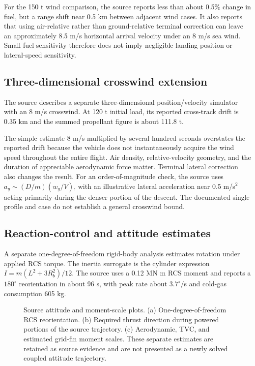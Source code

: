 \documentclass[11pt,a4paper]{article}
\begin{document}


For the 150 t wind comparison, the source reports less than about 0.5\% change in fuel, but a range shift near 0.5 km between adjacent wind cases. It also reports that using air-relative rather than ground-relative terminal correction can leave an approximately 8.5 m/s horizontal arrival velocity under an 8 m/s sea wind. Small fuel sensitivity therefore does not imply negligible landing-position or lateral-speed sensitivity.

\subsection{Three-dimensional crosswind extension}
The source describes a separate three-dimensional position/velocity simulator with an 8 m/s crosswind. At 120 t initial load, its reported cross-track drift is 0.35 km and the summed propellant figure is about 111.8 t.



The simple estimate $8$ m/s multiplied by several hundred seconds overstates the reported drift because the vehicle does not instantaneously acquire the wind speed throughout the entire flight. Air density, relative-velocity geometry, and the duration of appreciable aerodynamic force matter. Terminal lateral correction also changes the result. For an order-of-magnitude check, the source uses $a_y\sim(D/m)(w_y/V)$, with an illustrative lateral acceleration near 0.5 m/s$^2$ acting primarily during the denser portion of the descent. The documented single profile and case do not establish a general crosswind bound.

\subsection{Reaction-control and attitude estimates}
A separate one-degree-of-freedom rigid-body analysis estimates rotation under applied RCS torque. The inertia surrogate is the cylinder expression $I=m(L^2+3R_b^2)/12$. The source uses a 0.12 MN m RCS moment and reports a $180^\circ$ reorientation in about 96 s, with peak rate about $3.7^\circ$/s and cold-gas consumption 605 kg.



\begin{figure}[htbp]
\centering\SourceAttitudePlot
\caption{Source attitude and moment-scale plots. (a) One-degree-of-freedom RCS reorientation. (b) Required thrust direction during powered portions of the source trajectory. (c) Aerodynamic, TVC, and estimated grid-fin moment scales. These separate estimates are retained as source evidence and are not presented as a newly solved coupled attitude trajectory.}
\label{fig:attitude}
\end{figure}
\end{document}
